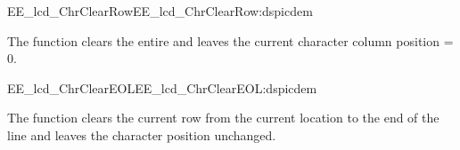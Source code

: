 \begin{function_nopb2}{EE\_lcd\_ChrClearRow}{EE_lcd_ChrClearRow:dspicdem}
  
  \begin{fundescription}
    The function clears the entire  and leaves the current
    character column position = 0.
  \end{fundescription}
  
  \begin{funparameters}
  \end{funparameters}
  
  
\end{function_nopb2}

\begin{function_nopb2}{EE\_lcd\_ChrClearEOL}{EE_lcd_ChrClearEOL:dspicdem}
  
  \begin{fundescription}
    The function clears the current row from the current location to
    the end of the line and leaves the character position unchanged.
  \end{fundescription}
  
  
  
\end{function_nopb2}

